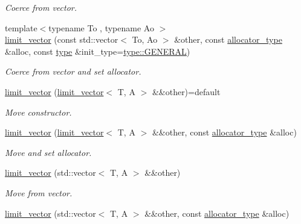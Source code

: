 \begin{DoxyCompactItemize}
\begin{DoxyCompactList}\small\item\em Coerce from vector. \end{DoxyCompactList}\item 
{\footnotesize template$<$typename To , typename Ao $>$ }\\\hyperlink{classIceBRG_1_1limit__vector_a5a9e118da630e7a7a038e376e41049f7}{limit\+\_\+vector} (const std\+::vector$<$ To, Ao $>$ \&other, const \hyperlink{classIceBRG_1_1limit__vector_ac75a579f04baed676ee916b0ad3dfec0}{allocator\+\_\+type} \&alloc, const \hyperlink{classIceBRG_1_1limit__vector_a67ad5ccda3b716a3aca2fa6223e75681}{type} \&init\+\_\+type=\hyperlink{classIceBRG_1_1limit__vector_a67ad5ccda3b716a3aca2fa6223e75681ab61773b9b3968a9988d765d728985862}{type\+::\+G\+E\+N\+E\+R\+A\+L})
\begin{DoxyCompactList}\small\item\em Coerce from vector and set allocator. \end{DoxyCompactList}\item 
\hyperlink{classIceBRG_1_1limit__vector_af9a42556163fef40c2c623494c7d7908}{limit\+\_\+vector} (\hyperlink{classIceBRG_1_1limit__vector}{limit\+\_\+vector}$<$ T, A $>$ \&\&other)=default
\begin{DoxyCompactList}\small\item\em Move constructor. \end{DoxyCompactList}\item 
\hyperlink{classIceBRG_1_1limit__vector_afebcca7a397bf0da6020039edf255a31}{limit\+\_\+vector} (\hyperlink{classIceBRG_1_1limit__vector}{limit\+\_\+vector}$<$ T, A $>$ \&\&other, const \hyperlink{classIceBRG_1_1limit__vector_ac75a579f04baed676ee916b0ad3dfec0}{allocator\+\_\+type} \&alloc)
\begin{DoxyCompactList}\small\item\em Move and set allocator. \end{DoxyCompactList}\item 
\hyperlink{classIceBRG_1_1limit__vector_a2520a38aa5e633dd6ebc716ced0791b2}{limit\+\_\+vector} (std\+::vector$<$ T, A $>$ \&\&other)
\begin{DoxyCompactList}\small\item\em Move from vector. \end{DoxyCompactList}\item 
\hyperlink{classIceBRG_1_1limit__vector_a6297026c0b0ea0c00c2ad891f5d38b32}{limit\+\_\+vector} (std\+::vector$<$ T, A $>$ \&\&other, const \hyperlink{classIceBRG_1_1limit__vector_ac75a579f04baed676ee916b0ad3dfec0}{allocator\+\_\+type} \&alloc)

\end{DoxyCompactItemize}
